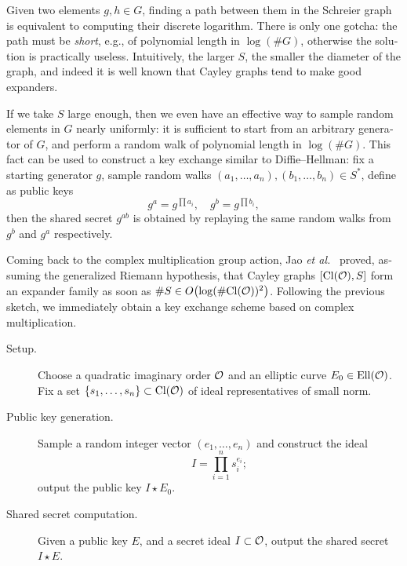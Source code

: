 \begin{otherlanguage}{english}
  Given two elements $g,h\in G$, finding a path between them in the
  Schreier graph is equivalent to computing their discrete
  logarithm. There is only one gotcha: the path must be \emph{short},
  e.g., of polynomial length in $\log(\#G)$, otherwise the solution is
  practically useless. Intuitively, the larger $S$, the smaller the
  diameter of the graph, and indeed it is well known that Cayley
  graphs tend to make good expanders.

  If we take $S$ large enough, then we even have an effective way to
  sample random elements in $G$ nearly uniformly: it is sufficient to
  start from an arbitrary generator of $G$, and perform a random walk
  of polynomial length in $\log(\#G)$. This fact can be used to
  construct a key exchange similar to Diffie--Hellman: fix a starting
  generator $g$, sample random walks
  $(a_1,\ldots,a_n), (b_1,\ldots,b_n)\in S^*$, define as public keys
  \[g^a = g^{\prod a_i}, \quad g^b = g^{\prod b_i},\] then the shared
  secret $g^{ab}$ is obtained by replaying the same random walks from
  $g^b$ and $g^a$ respectively.

  Coming back to the complex multiplication group action, Jao \emph{et
    al.}~\cite{jao+miller+venkatesan09} proved, assuming the
  generalized Riemann hypothesis, that Cayley graphs $[\mathrm{Cl}(\mathcal{O}),S]$
  form an expander family as soon as
  $\#S\in O\bigl(\log(\#\mathrm{Cl}(\mathcal{O}))^2\bigr)$. Following the previous
  sketch, we immediately obtain a key exchange scheme based on complex
  multiplication.

  \begin{description}
  \item[Setup.] Choose a quadratic imaginary order $\mathcal{O}$ and an
    elliptic curve $E_0 \in \mathrm{Ell}(\mathcal{O})$. Fix a set
    $\{s_1,\dots,s_n\}\subset\mathrm{Cl}(\mathcal{O})$ of ideal representatives of
    small norm.
  \item[Public key generation.] Sample a random integer vector
    $(e_1,\ldots,e_n)$ and construct the ideal
    \[I = \prod_{i=1}^n s_i^{e_i};\]
    output the public key $I\star E_0$.
  \item[Shared secret computation.] Given a public key $E$, and a
    secret ideal $I\subset\mathcal{O}$, output the shared secret $I\star E$.
  \end{description}


\end{otherlanguage}
